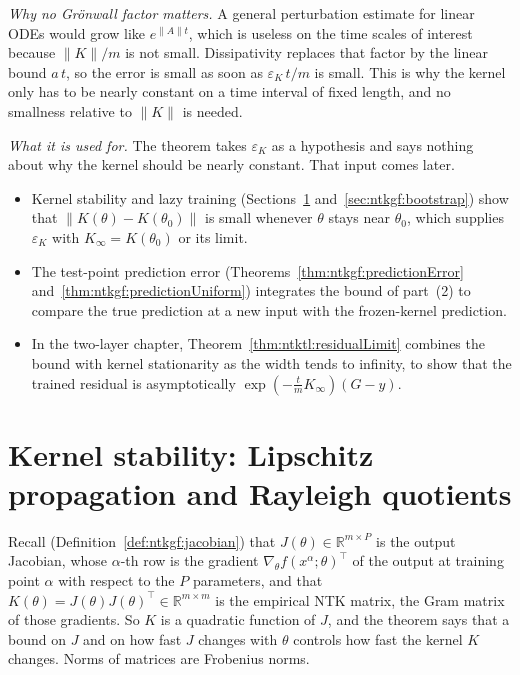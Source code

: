 \begin{remark}
\emph{Why no Gr\"onwall factor matters.} A general perturbation estimate for linear ODEs would grow like $e^{\|A\|t}$, which is useless on the time scales of interest because $\|K\|/m$ is not small. Dissipativity replaces that factor by the linear bound $a\,t$, so the error is small as soon as $\varepsilon_K\,t/m$ is small. This is why the kernel only has to be nearly constant on a time interval of fixed length, and no smallness relative to $\|K\|$ is needed.

\emph{What it is used for.} The theorem takes $\varepsilon_K$ as a hypothesis and says nothing about why the kernel should be nearly constant. That input comes later.
\begin{itemize}
  \item Kernel stability and lazy training (Sections~\ref{sec:ntkgf:kernelStability} and~\ref{sec:ntkgf:bootstrap}) show that $\|K(\theta)-K(\theta_0)\|$ is small whenever $\theta$ stays near $\theta_0$, which supplies $\varepsilon_K$ with $K_\infty=K(\theta_0)$ or its limit.
  \item The test-point prediction error (Theorems~\ref{thm:ntkgf:predictionError} and~\ref{thm:ntkgf:predictionUniform}) integrates the bound of part~(2) to compare the true prediction at a new input with the frozen-kernel prediction.
  \item In the two-layer chapter, Theorem~\ref{thm:ntktl:residualLimit} combines the bound with kernel stationarity as the width tends to infinity, to show that the trained residual is asymptotically $\exp(-\frac tmK_\infty)(G-y)$.
\end{itemize}
\end{remark}


\section{Kernel stability: Lipschitz propagation and Rayleigh quotients}\label{sec:ntkgf:kernelStability}

Recall (Definition~\ref{def:ntkgf:jacobian}) that $J(\theta)\in\mathbb R^{m\times P}$ is the output Jacobian, whose $\alpha$-th row is the gradient $\nabla_\theta f(x^\alpha;\theta)^\top$ of the output at training point $\alpha$ with respect to the $P$ parameters, and that $K(\theta)=J(\theta)J(\theta)^\top\in\mathbb R^{m\times m}$ is the empirical NTK matrix, the Gram matrix of those gradients.
So $K$ is a quadratic function of $J$, and the theorem says that a bound on $J$ and on how fast $J$ changes with $\theta$ controls how fast the kernel $K$ changes. Norms of matrices are Frobenius norms.

